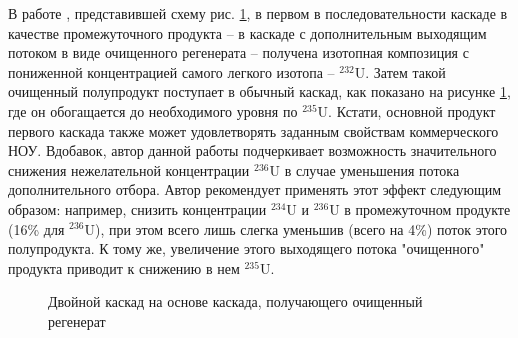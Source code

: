 В работе \cite{palkinPurificationReprocessedUranium2016}, представившей схему рис. \ref{fig:int_double}, в первом в последовательности каскаде в качестве промежуточного продукта -- в каскаде с дополнительным выходящим потоком в виде очищенного регенерата -- получена изотопная композиция с пониженной концентрацией самого легкого изотопа --  $^{232}$U. Затем такой очищенный полупродукт поступает в обычный каскад, как показано на рисунке \ref{fig:int_double}, где он обогащается до необходимого уровня по $^{235}$U. Кстати, основной продукт первого каскада также может удовлетворять заданным свойствам коммерческого НОУ. Вдобавок, автор данной работы подчеркивает возможность значительного снижения нежелательной концентрации $^{236}$U в случае уменьшения потока дополнительного отбора. Автор рекомендует применять этот эффект следующим образом: например, снизить концентрации  $^{234}$U и  $^{236}$U в промежуточном продукте (16\% для  $^{236}$U), при этом всего лишь слегка уменьшив (всего на 4\%) поток этого полупродукта. К тому же, увеличение этого выходящего потока "очищенного" продукта приводит к снижению в нем $^{235}$U.
\begin{figure}[ht]
  \caption{Двойной каскад на основе каскада, получающего очищенный регенерат}\label{fig:int_double}
\end{figure}

